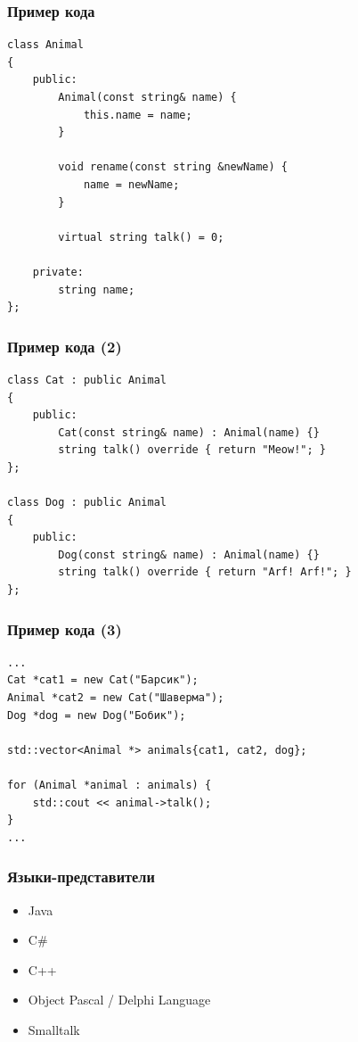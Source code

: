 \documentclass[xetex,mathserif,serif]{beamer}
\begin{document}
    \begin{frame}[fragile]
        \frametitle{Пример кода}
        \begin{verbatim}
class Animal
{
    public:
        Animal(const string& name) { 
            this.name = name; 
        }

        void rename(const string &newName) { 
            name = newName; 
        }

        virtual string talk() = 0;

    private:
        string name;
};
        \end{verbatim}
    \end{frame}

    \begin{frame}[fragile]
        \frametitle{Пример кода (2)}
        \begin{verbatim}
class Cat : public Animal
{
    public:
        Cat(const string& name) : Animal(name) {}
        string talk() override { return "Meow!"; }
};

class Dog : public Animal
{
    public:
        Dog(const string& name) : Animal(name) {}
        string talk() override { return "Arf! Arf!"; }
};
        \end{verbatim}
    \end{frame}

    \begin{frame}[fragile]
        \frametitle{Пример кода (3)}
        \begin{verbatim}
...
Cat *cat1 = new Cat("Барсик");
Animal *cat2 = new Cat("Шаверма");
Dog *dog = new Dog("Бобик");

std::vector<Animal *> animals{cat1, cat2, dog};

for (Animal *animal : animals) {
    std::cout << animal->talk();
}
...
        \end{verbatim}
    \end{frame}

    \begin{frame}
        \frametitle{Языки-представители}
        \begin{itemize}
            \item Java
            \item C\#
            \item C++
            \item Object Pascal / Delphi Language
            \item Smalltalk
        \end{itemize}
    \end{frame}
\end{document}
